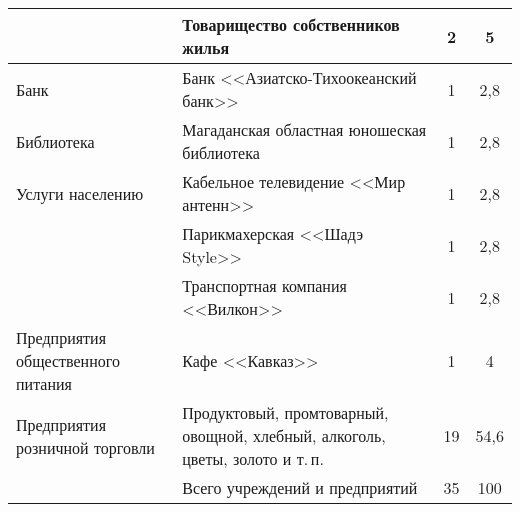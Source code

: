 \begin{table}[h!]
\begin{changemargin}{-1cm}{-1cm}
\begin{tabular}{p{5cm}p{7cm}cc}
  \cmidrule(r){2-4}                                      & Товарищество 				собственников жилья                                                                                                                      & 2               & 5               \\ \midrule
Банк                                    & Банк 				<<Азиатско-Тихоокеанский банк>>                                                                                                                    & 1               & 2,8               \\ \midrule
Библиотека                              & Магаданская 				областная юношеская библиотека                                                                                                            & 1               & 2,8               \\ \midrule
Услуги 				населению                    & Кабельное 				телевидение <<Мир антенн>>                                                                                                                    & 1               & 2,8               \\
  \cmidrule(r){2-4}                                      & Парикмахерская 				<<Шадэ Style>>                                                                                                                           & 1               & 2,8               \\
  \cmidrule(r){2-4}                                      & Транспортная 				компания <<Вилкон>>                                                                                                                        & 1               & 2,8               \\ \midrule
Предприятия 				общественного питания   &  Кафе <<Кавказ>>                                                                                                                     & 1               & 4               \\ \midrule
Предприятия 				розничной торговли      & Продуктовый, 				промтоварный, овощной, хлебный, 				алкоголь, цветы, золото и т.\,п.                                                                       & 19              & 54,6              \\  \bottomrule
                                       &    Всего учреждений и предприятий                                                                                                                          & 35              & 100\\


                                        \bottomrule
\end{tabular}
\end{changemargin}
\vspace{-18pt}
\end{table}

